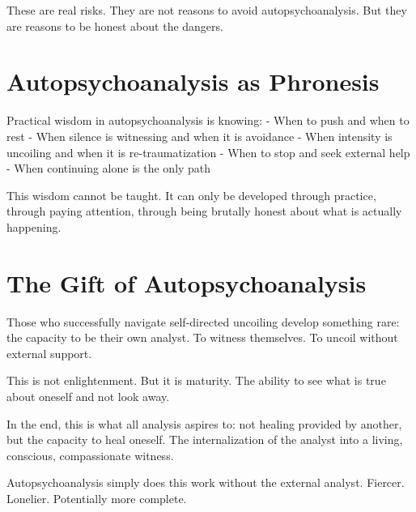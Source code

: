 \documentclass[12pt]{article}
\begin{document}
These are real risks. They are not reasons to avoid autopsychoanalysis. But they are reasons to be honest about the dangers.

\section{Autopsychoanalysis as Phronesis}

Practical wisdom in autopsychoanalysis is knowing:
- When to push and when to rest
- When silence is witnessing and when it is avoidance
- When intensity is uncoiling and when it is re-traumatization
- When to stop and seek external help
- When continuing alone is the only path

This wisdom cannot be taught. It can only be developed through practice, through paying attention, through being brutally honest about what is actually happening.

\section{The Gift of Autopsychoanalysis}

Those who successfully navigate self-directed uncoiling develop something rare: the capacity to be their own analyst. To witness themselves. To uncoil without external support.

This is not enlightenment. But it is maturity. The ability to see what is true about oneself and not look away.

In the end, this is what all analysis aspires to: not healing provided by another, but the capacity to heal oneself. The internalization of the analyst into a living, conscious, compassionate witness.

Autopsychoanalysis simply does this work without the external analyst. Fiercer. Lonelier. Potentially more complete.
\end{document}
